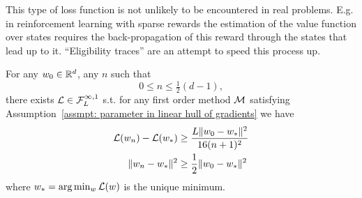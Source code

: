 \begin{remark}
	This type of loss function is not unlikely to be encountered in real
	problems. E.g. in reinforcement learning with sparse rewards the estimation
	of the value function over states requires the back-propagation of this
	reward through the states that lead up to it. ``Eligibility traces''
	\parencite[Chapter 12]{suttonReinforcementLearningIntroduction2018}
	are an attempt to speed this process up.
\end{remark}
\begin{theorem}\label{thm: convex function complexity bound}
	For any \(\weights_0\in\reals^d\), any \(n\) such that 
	\[0\le n\le \tfrac12 (d-1),\]
	there exists \(\Loss\in\lipGradientSet[\infty,1]{\ubound}\)
	s.t. for any first order method \(\firstOrderMethod\)
	satisfying Assumption~\ref{assmpt: parameter in linear hull of gradients}
	we have
	\begin{subequations}
	\begin{align}
		\Loss(\weights_n) - \Loss(\minimum)
		&\ge \frac{\ubound \|\weights_0 - \minimum\|^2}{16(n+1)^2} \\
		\|\weights_n -\minimum\|^2 
		&\ge \frac12 \|\weights_0 - \minimum\|^2
	\end{align}
	\end{subequations}
	where \(\minimum = \arg\min_\weights \Loss(\weights)\) is the unique minimum.
\end{theorem}
